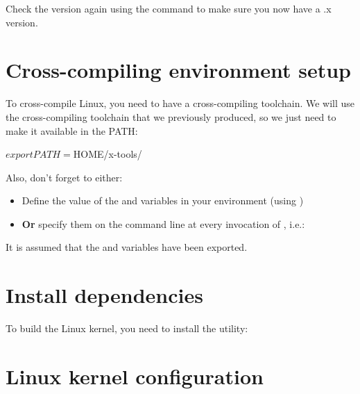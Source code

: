 Check the version again using the  command
to make sure you now have a \workingkernel.x version.

\section{Cross-compiling environment setup}

To cross-compile Linux, you need to have a cross-compiling
toolchain. We will use the cross-compiling toolchain that we
previously produced, so we just need to make it available in the PATH:

\begin{bashinput}
$ export PATH=$HOME/x-tools/%
\end{bashinput}

Also, don't forget to either:

\begin{itemize}
\item Define the value of the  and 
  variables in your environment (using )
\item {\bf Or} specify them on the command line at every invocation of
  , i.e.: 
\end{itemize}

It is assumed that the  and  variables have been exported.

\section{Install dependencies}

To build the Linux kernel, you need to install the  utility:


\section{Linux kernel configuration}

